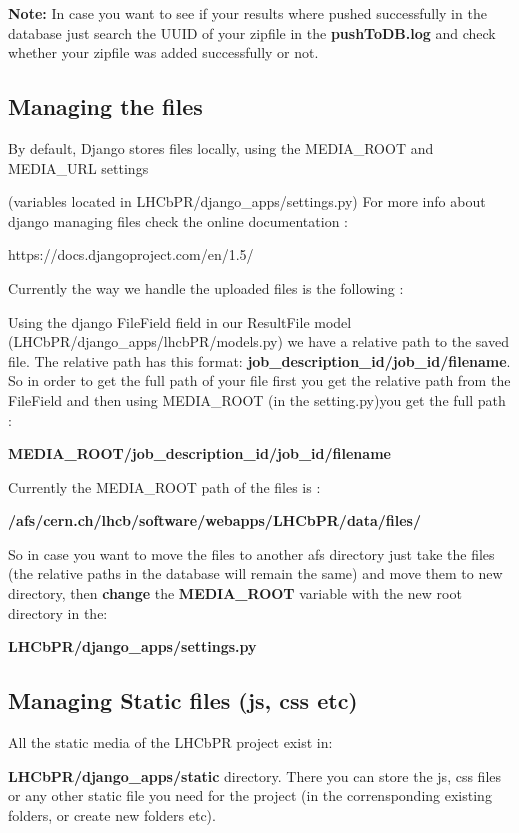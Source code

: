 \documentclass{lhcbnote}
\begin{document}
{\bf Note:} In case you want to see if your results where pushed successfully in the database just search the UUID of your zipfile in the {\bf pushToDB.log} and 
check whether your  zipfile was added successfully or not. 

\subsection {Managing the files}

By default, Django stores files locally, using the MEDIA\_ROOT and MEDIA\_URL settings 

(variables located in LHCbPR/django\_apps/settings.py)
For more info about django managing files check the online documentation : 

https://docs.djangoproject.com/en/1.5/

Currently the way we handle the uploaded files is the following :

Using the django FileField field in our ResultFile model (LHCbPR/django\_apps/lhcbPR/models.py) we have a relative 
path to the saved file. The relative path has this format: {\bf job\_description\_id/job\_id/filename}. So in order to get the full path of your file 
first you get the relative path from the FileField and then using MEDIA\_ROOT (in the setting.py)you get the full path :

{\bf MEDIA\_ROOT/job\_description\_id/job\_id/filename}

Currently the MEDIA\_ROOT path of the files is : 

{\bf /afs/cern.ch/lhcb/software/webapps/LHCbPR/data/files/}

So in case you want to move the files to another afs directory just take the files (the relative paths in the database will remain the same) and move 
them to new directory, then {\bf change} the {\bf MEDIA\_ROOT} variable with the new root directory in the:

{\bf LHCbPR/django\_apps/settings.py}

\subsection {Managing Static files (js, css etc)}

All the static media of the LHCbPR project exist in:

{\bf LHCbPR/django\_apps/static} directory. There you can store the js, css files or any other static file you 
need for the project (in the corrensponding existing folders, or create new folders etc).
\end{document}
